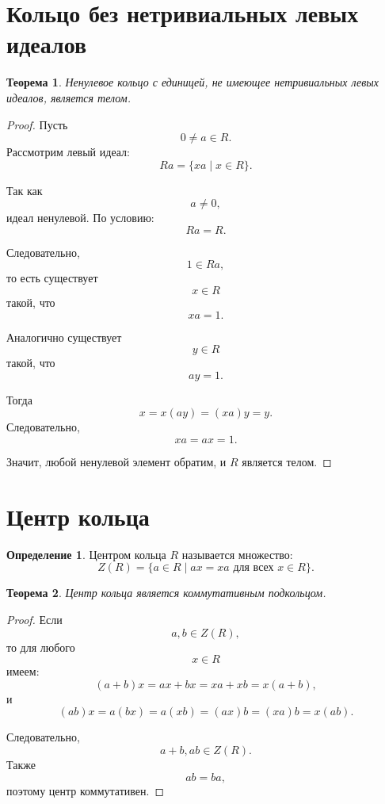 \documentclass[12pt, a4paper]{article}
\newtheorem{theorem}{Теорема}
\theoremstyle{definition}
\newtheorem{definition}{Определение}
\theoremstyle{remark}
\begin{document}
\section{Кольцо без нетривиальных левых идеалов}

\begin{theorem}
	Ненулевое кольцо с единицей, не имеющее нетривиальных левых идеалов,
	является телом.
\end{theorem}

\begin{proof}
	Пусть
	\[
	0\neq a\in R.
	\]
	Рассмотрим левый идеал:
	\[
	Ra=\{xa\mid x\in R\}.
	\]
	
	Так как
	\[
	a\neq0,
	\]
	идеал ненулевой. По условию:
	\[
	Ra=R.
	\]
	
	Следовательно,
	\[
	1\in Ra,
	\]
	то есть существует
	\[
	x\in R
	\]
	такой, что
	\[
	xa=1.
	\]
	
	Аналогично существует
	\[
	y\in R
	\]
	такой, что
	\[
	ay=1.
	\]
	
	Тогда
	\[
	x=x(ay)=(xa)y=y.
	\]
	Следовательно,
	\[
	xa=ax=1.
	\]
	
	Значит, любой ненулевой элемент обратим, и $R$ является телом.
\end{proof}

\section{Центр кольца}

\begin{definition}
	Центром кольца $R$ называется множество:
	\[
	Z(R)=\{a\in R\mid ax=xa \text{ для всех } x\in R\}.
	\]
\end{definition}

\begin{theorem}
	Центр кольца является коммутативным подкольцом.
\end{theorem}

\begin{proof}
	Если
	\[
	a,b\in Z(R),
	\]
	то для любого
	\[
	x\in R
	\]
	имеем:
	\[
	(a+b)x=ax+bx=xa+xb=x(a+b),
	\]
	и
	\[
	(ab)x=a(bx)=a(xb)=(ax)b=(xa)b=x(ab).
	\]
	
	Следовательно,
	\[
	a+b,ab\in Z(R).
	\]
	Также
	\[
	ab=ba,
	\]
	поэтому центр коммутативен.
\end{proof}

\end{document}
